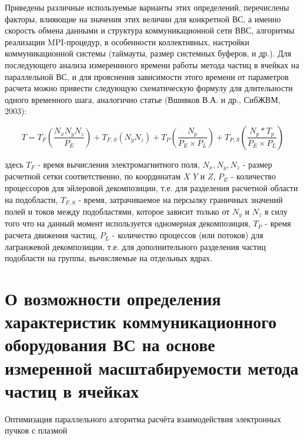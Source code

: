 			Приведены различные используемые варианты этих определений, перечислены факторы, влияющие на  значения этих величин для конкретной ВС, а именно скорость обмена данными и структура коммуникационной сети ВВС, алгоритмы реализации MPI-процедур, в особенности коллективных, настройки коммуникационной системы (таймауты, размер системных буферов, и др.).
			Для последующего анализа измереннного времени работы метода частиц в ячейках на параллельной ВС, и для прояснения зависимости этого времени от параметров расчета можно привести следующую схематическую формулу для длительности одного временного шага, аналогично статье (Вшивков В.А. и др., СибЖВМ, 2003):
			
			\begin{equation}
			\label{PIC-timestep}
			T=T_{F} \left ( \frac{N_x N_y N_z }{P_E}\right )+ T_{F,S}\left (N_y N_z\right ) + T_P\left(\frac{N_p}{P_E\times P_L}\right) +T_{P,S}\left (\frac{N_p*T_p}{P_E\times P_L}\right)
		\end{equation}
			 
		здесь $T_{F}$ - время вычисления электромагнитного поля, $N_x, N_y, N_z$ - размер расчетной сетки соответственно, по координатам $X$ $Y$ и $Z$, $P_E$ - количество процессоров для эйлеровой декомпозиции, т.е. для разделения расчетной области на подобласти, $T_{F,S}$ - время, затрачиваемое на персылку граничных значений полей и токов между подобластями, которое зависит только от $N_y$ и $N_z$ в силу того что на данный момент используется одномерная декомпозиция,  $T_P$ - время расчета движения частиц, $P_L$ - количество процессов (или потоков) для лагранжевой декомпозиции, т.е. для дополнительного разделения частиц подобласти на группы, вычисляемые на отдельных ядрах.
		
	
	    \section{О возможности определения характеристик коммуникационного оборудования ВС на основе измеренной масштабируемости метода частиц в ячейках}
	    
	    Оптимизация параллельного алгоритма расчёта взаимодействия электронных пучков с плазмой
	    
